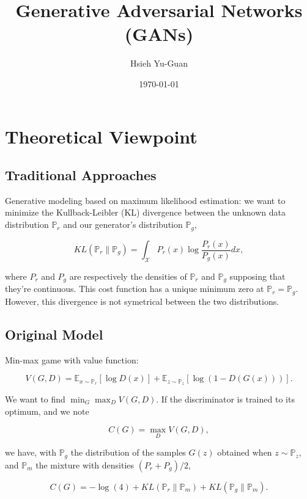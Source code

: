 
\title{Generative Adversarial Networks (GANs)\vspace{-0.5em}}
\author{Hsieh Yu-Guan}
\date{\today}
\maketitle


\section*{Theoretical Viewpoint}

\subsection*{Traditional Approaches}

Generative modeling based on maximum likelihood estimation: we want to
minimize the Kullback-Leibler (KL) divergence between the unknown data
distribution $\mathbb{P}_r$ and our generator's distribution
$\mathbb{P}_g$,

\[ 
  KL(\mathbb{P}_r\|\mathbb{P}_g)
  = \int_{\mathcal{X}} P_r(x)\log\frac{P_r(x)}{P_g(x)} dx,
\]

where $P_r$ and $P_g$ are respectively the densities of $\mathbb{P}_r$
and $\mathbb{P}_g$ supposing that they're continuous. This cost function
has a unique minimum zero at $\mathbb{P}_r = \mathbb{P}_g$. However,
this divergence is not symetrical between the two distributions.

\subsection*{Original Model}

Min-max game with value function:

\[ 
  V(G, D)
  = \mathbb{E}_{x\sim \mathbb{P}_r}[\log D(x)]
  + \mathbb{E}_{z\sim \mathbb{P}_z}[\log(1-D(G(x)))].
\]

We want to find $\min_G \max_D V(G, D)$. If the discriminator is trained to
its optimum, and we note

\[ C(G) = \max_D V(G, D), \]

we have, with $\mathbb{P}_g$ the distribution of the samples $G(z)$
obtained when $z \sim \mathbb{P}_z$, and $\mathbb{P}_m$ the mixture with
densities $(P_r+P_g)/2$,

\[
  C(G) = -\log(4) + KL(\mathbb{P}_r \| \mathbb{P}_m) 
         + KL(\mathbb{P}_g \| \mathbb{P}_m).
\]

